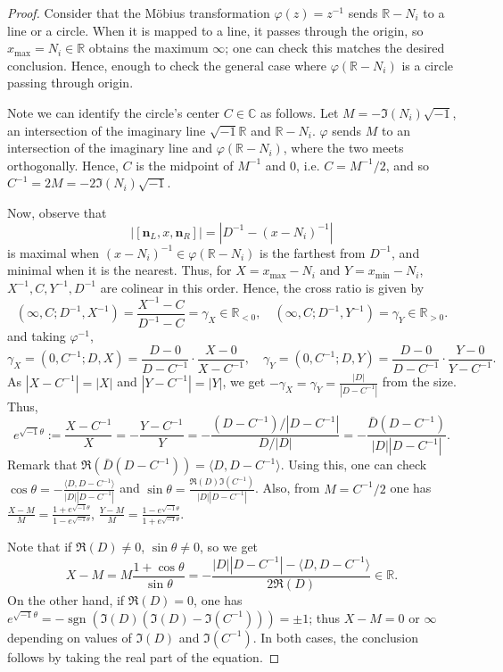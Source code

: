 \documentclass{article}
\theoremstyle{definition}
\theoremstyle{plain}
\theoremstyle{remark}
\numberwithin{equation}{section}
\newcommand{\bR}{\mathbb{R}}
\newcommand{\bC}{\mathbb{C}}
\newcommand{\abs}[1]{\left| {#1} \right|}
\newcommand{\inprod}[2]{\langle {#1}, {#2} \rangle}
\newcommand{\im}{{\sqrt{-1}}}
\DeclareMathOperator{\sgn}{sgn}
\def\nsL{{\mathbf{n}_L}}
\def\nsR{{\mathbf{n}_R}}
\begin{document}
\begin{proof}
  Consider that the M\"{o}bius transformation $\varphi(z) = z^{-1}$ sends $\bR - N_i$ to a line or a circle.
  When it is mapped to a line, it passes through the origin,
  so $x_{\max} = N_i \in \bR$ obtains the maximum $\infty$; one can check this matches the desired conclusion.
  Hence, enough to check the general case where $\varphi(\bR - N_i)$ is a circle passing through origin.

  Note we can identify the circle's center $C \in \bC$ as follows.
  Let $M = - \Im(N_i) \im$, an intersection of the imaginary line $\im \bR$ and $\bR - N_i$.
  $\varphi$ sends $M$ to an intersection of the imaginary line and $\varphi(\bR - N_i)$,
  where the two meets orthogonally.
  Hence, $C$ is the midpoint of $M^{-1}$ and $0$, i.e. $C = M^{-1}/2$,
  and so $C^{-1} = 2M = - 2 \Im(N_i) \im$.

  Now, observe that
  \[
    \abs{[\nsL, x, \nsR]} = \abs{D^{-1} - (x - N_i)^{-1}}
  \]
  is maximal when $(x - N_i)^{-1} \in \varphi(\bR - N_i)$ is the farthest from $D^{-1}$,
  and minimal when it is the nearest.
  Thus, for $X = x_{\max} - N_i$ and $Y = x_{\min} - N_i$,
  $X^{-1}, C, Y^{-1}, D^{-1}$ are colinear in this order.
  Hence, the cross ratio is given by
  \[
    (\infty, C; D^{-1}, X^{-1}) = \frac{X^{-1} - C}{D^{-1} - C} = \gamma_X \in \bR_{< 0},
    \quad
    (\infty, C; D^{-1}, Y^{-1}) = \gamma_Y \in \bR_{> 0}.
  \]
  and taking $\varphi^{-1}$,
  \[
    \gamma_X = (0, C^{-1}; D, X) = \frac{D - 0}{D - C^{-1}} \cdot \frac{X - 0}{X - C^{-1}},
    \quad
    \gamma_Y = (0, C^{-1}; D, Y) = \frac{D - 0}{D - C^{-1}} \cdot \frac{Y - 0}{Y - C^{-1}}.
  \]
  As $\abs{X - C^{-1}} = \abs{X}$ and $\abs{Y - C^{-1}} = \abs{Y}$,
  we get $-\gamma_X = \gamma_Y = \frac{\abs{D}}{\abs{D - C^{-1}}}$ from the size. Thus,
  \[
    e^{\im \theta} := \frac{X - C^{-1}}{X} = - \frac{Y - C^{-1}}{Y} = - \frac{(D - C^{-1}) / \abs{D - C^{-1}}}{D / \abs{D}}
    = - \frac{\bar{D} (D - C^{-1})}{\abs{D} \abs{D - C^{-1}}}.
  \]
  Remark that $\Re(\bar{D} (D - C^{-1})) = \inprod{D}{D - C^{-1}}$.
  Using this, one can check $\cos \theta = - \frac{\inprod{D}{D - C^{-1}}}{\abs{D} \abs{D - C^{-1}}}$
  and $\sin \theta = \frac{\Re(D) \Im(C^{-1})}{\abs{D} \abs{D - C^{-1}}}$.
  Also, from $M = C^{-1} / 2$ one has
  $\frac{X - M}{M} = \frac{1 + e^{\im \theta}}{1 - e^{\im \theta}}$,
  $\frac{Y - M}{M} = \frac{1 - e^{\im \theta}}{1 + e^{\im \theta}}$.

  Note that if $\Re(D) \neq 0$, $\sin \theta \neq 0$, so we get
  \[
    X - M = M \frac{1 + \cos \theta}{\sin \theta} = - \frac{|D| |D - C^{-1}| - \inprod{D}{D - C^{-1}}}{2 \Re(D)} \in \bR.
  \]
  On the other hand, if $\Re(D) = 0$,
  one has $e^{\im \theta} = - \sgn(\Im(D) (\Im(D) - \Im(C^{-1}))) = \pm 1$;
  thus $X - M = 0$ or $\infty$ depending on values of $\Im(D)$ and $\Im(C^{-1})$.
  In both cases, the conclusion follows by taking the real part of the equation.
\end{proof}
\end{document}
